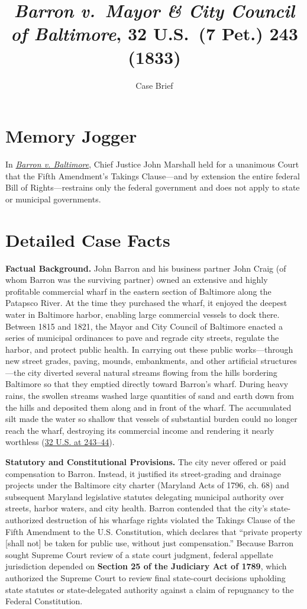 \documentclass[12pt]{article}
\title{\textit{Barron v.\ Mayor \& City Council of Baltimore}, 32 U.S.\ (7 Pet.) 243 (1833)}
\subtitle{Case Brief}
\author{}
\date{}
\begin{document}
\maketitle

\section{Memory Jogger}

In \href{https://supreme.justia.com/cases/federal/us/32/243/}{\textit{Barron v. Baltimore}}, Chief Justice John Marshall held for a unanimous Court that the Fifth Amendment's Takings Clause---and by extension the entire federal Bill of Rights---restrains only the federal government and does not apply to state or municipal governments.

\section{Detailed Case Facts}

\textbf{Factual Background.} John Barron and his business partner John Craig (of whom Barron was the surviving partner) owned an extensive and highly profitable commercial wharf in the eastern section of Baltimore along the Patapsco River. At the time they purchased the wharf, it enjoyed the deepest water in Baltimore harbor, enabling large commercial vessels to dock there. Between 1815 and 1821, the Mayor and City Council of Baltimore enacted a series of municipal ordinances to pave and regrade city streets, regulate the harbor, and protect public health. In carrying out these public works---through new street grades, paving, mounds, embankments, and other artificial structures---the city diverted several natural streams flowing from the hills bordering Baltimore so that they emptied directly toward Barron's wharf. During heavy rains, the swollen streams washed large quantities of sand and earth down from the hills and deposited them along and in front of the wharf. The accumulated silt made the water so shallow that vessels of substantial burden could no longer reach the wharf, destroying its commercial income and rendering it nearly worthless (\href{https://supreme.justia.com/cases/federal/us/32/243/}{32 U.S. at 243--44}).

\textbf{Statutory and Constitutional Provisions.} The city never offered or paid compensation to Barron. Instead, it justified its street-grading and drainage projects under the Baltimore city charter (Maryland Acts of 1796, ch. 68) and subsequent Maryland legislative statutes delegating municipal authority over streets, harbor waters, and city health. Barron contended that the city's state-authorized destruction of his wharfage rights violated the Takings Clause of the Fifth Amendment to the U.S. Constitution, which declares that ``private property [shall not] be taken for public use, without just compensation.'' Because Barron sought Supreme Court review of a state court judgment, federal appellate jurisdiction depended on \textbf{Section 25 of the Judiciary Act of 1789}, which authorized the Supreme Court to review final state-court decisions upholding state statutes or state-delegated authority against a claim of repugnancy to the Federal Constitution.
\end{document}

